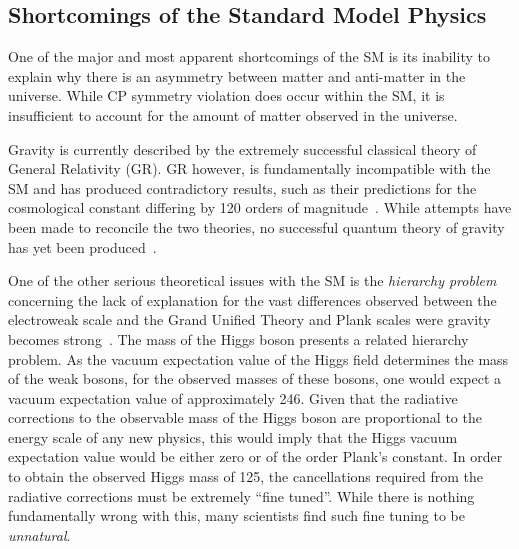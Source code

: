 \subsection{Shortcomings of the Standard Model Physics}\label{subsec:shortcomings}
One of the major and most apparent shortcomings of the SM is its inability to explain why there is an asymmetry between matter and anti-matter in the universe.
While CP symmetry violation does occur within the SM, it is insufficient to account for the amount of matter observed in the universe.

Gravity is currently described by the extremely successful classical theory of General Relativity (GR).
GR however, is fundamentally incompatible with the SM and  has produced contradictory results, such as their predictions for the cosmological constant differing by 120 orders of magnitude~\cite{Adler:1995vd}.
While attempts have been made to reconcile the two theories, no successful quantum theory of gravity has yet been produced~\cite{Sola:2013gha}.	

One of the other serious theoretical issues with the SM is the \emph{hierarchy problem} concerning the lack of explanation for the vast differences observed between the electroweak scale and the Grand Unified Theory and Plank scales were gravity becomes strong~\cite{Burdman:2007ck}.
The mass of the Higgs boson presents a related hierarchy problem.
As the vacuum expectation value of the Higgs field determines the mass of the weak bosons, for the observed masses of these bosons, one would expect a vacuum expectation value of approximately 246\GeV.
Given that the radiative corrections to the observable mass of the Higgs boson are proportional to the energy scale of any new physics, this would imply that the Higgs vacuum expectation value would be either zero or of the order Plank's constant.
In order to obtain the observed Higgs mass of 125\GeV, the cancellations required from the radiative corrections must be extremely ``fine tuned''.
While there is nothing fundamentally wrong with this, many scientists find such fine tuning to be \emph{unnatural}.


